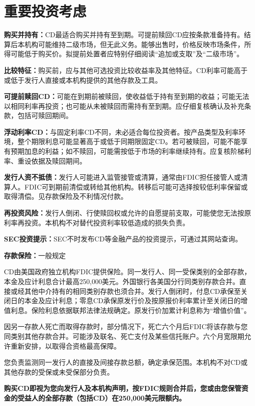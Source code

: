 \documentclass[UTF8,fontset=none,11pt,a4paper]{ctexart}
\begin{document}
\section*{重要投资考虑}
\textbf{购买并持有：}CD最适合购买并持有至到期。可提前赎回CD应按条款准备持有。结算后本机构可能维持二级市场，但无此义务。能够出售时，价格反映市场条件，所得可能低于购买价。拟提前处置者应特别仔细阅读“追加或支取”及“二级市场”。


\textbf{比较特征：}购买前，应与其他可选投资比较收益率及其他特征。CD利率可能高于或低于发行人直接或本机构提供的其他存款及工具。


\textbf{可提前赎回CD：}可能在到期前被赎回，使收益低于持有至到期的收益；可能无法以相同利率再投资；也可能从未被赎回而需持有至到期。应仔细复核确认及补充条款，包括可赎回期间。


\textbf{浮动利率CD：}与固定利率CD不同，未必适合每位投资者。按产品类型及利率环境，整个期限利息可能显著高于或低于同期限固定CD。若可被赎回，可能不能享有预期加息的利益；如不赎回，可能需按低于市场的利率继续持有。应复核阶梯利率、重设依据及赎回期间。


\textbf{发行人资不抵债：}发行人可能进入监管接管或清算，通常由FDIC担任接管人或清算人。FDIC可到期前清偿或转给其他机构。转移后可能可选择按较低利率保留或取得清偿。见存款保险及不利情况付款。


\textbf{再投资风险：}发行人倒闭、行使赎回权或允许的自愿提前支取，可能使您无法按原利率再投资。本机构不对替代投资利率较低造成的损失负责。


\textbf{SEC投资提示：}SEC不时发布CD等金融产品的投资提示，可通过其网站查询。


\textbf{存款保险：}一般规定


CD由美国政府独立机构FDIC提供保险。同一发行人、同一受保类别的全部存款，本金及应计利息合计最高250,000美元。外国银行各美国分行同类别存款合并。直接或经其他中介持有的相同类别存款也须合并。发行人倒闭时，付息CD承保至关闭日的本金及应计利息；零息CD承保原发行价及按原报价利率累计至关闭日的增值利息。保险利息依据联邦法律法规确定。原发行价加累计利息称为“增值价值”。


因另一存款人死亡而取得存款时，部分情况下，死亡六个月后FDIC将该存款与您同类别其他存款合并。可能涉及联名、死亡支付及某些信托账户。六个月宽限期允许重新安排，以取得合资格最高保障。


您负责监测同一发行人的直接及间接存款总额，确定承保范围。本机构不对CD或其他存款的受保或未受保部分负责。


\textbf{购买CD即视为您向发行人及本机构声明，按FDIC规则合并后，您或由您保管资金的受益人的全部存款（包括CD）在250,000美元限额内。}
\end{document}
